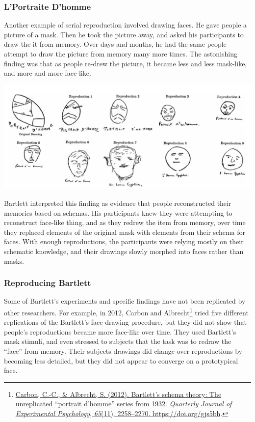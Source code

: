 \documentclass[
  oneside,
  12pt]{crumpbook}
\begin{document}
\hypertarget{lportraite-dhomme}{%
\subsubsection{L'Portraite D'homme}\label{lportraite-dhomme}}

Another example of serial reproduction involved drawing faces. He gave people a picture of a mask. Then he took the picture away, and asked his participants to draw the it from memory. Over days and months, he had the same people attempt to draw the picture from memory many more times. The astonishing finding was that as people re-drew the picture, it became less and less mask-like, and more and more face-like.

\begin{center}\includegraphics[width=1\linewidth]{imgs/Bartlett_homme} \end{center}

Bartlett interpreted this finding as evidence that people reconstructed their memories based on schemas. His participants knew they were attempting to reconstruct face-like thing, and as they redrew the item from memory, over time they replaced elements of the original mask with elements from their schema for faces. With enough reproductions, the participants were relying mostly on their schematic knowledge, and their drawings slowly morphed into faces rather than masks.

\hypertarget{reproducing-bartlett}{%
\subsubsection{Reproducing Bartlett}\label{reproducing-bartlett}}

Some of Bartlett's experiments and specific findings have not been replicated by other researchers. For example, in 2012, Carbon and Albrecht\footnote{\protect\hyperlink{ref-carbonBartlettSchemaTheory2012}{Carbon, C.-C., \& Albrecht, S. (2012). Bartlett's schema theory: {The} unreplicated {``portrait d'homme''} series from 1932. \emph{Quarterly Journal of Experimental Psychology}, \emph{65}(11), 2258--2270. \url{https://doi.org/gjs5bh}}.} tried five different replications of the Bartlett's face drawing procedure, but they did not show that people's reproductions became more face-like over time. They used Bartlett's mask stimuli, and even stressed to subjects that the task was to redraw the ``face'' from memory. Their subjects drawings did change over reproductions by becoming less detailed, but they did not appear to converge on a prototypical face.
\end{document}
